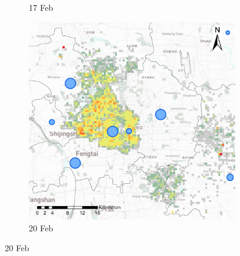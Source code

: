 \documentclass[preprints,article,accept,moreauthors,pdftex]{Definitions/mdpi}
\begin{document}
\begin{figure}[ht]
\begin{subfigure}{.3\textwidth}
        \caption{17 Feb}\label{fig:correlation_02_17}
    \end{subfigure}
    \begin{subfigure}{.3\textwidth}
        \includegraphics[width=\textwidth]{Figures/Relation_with_confrimed_cases/NewDistrictSSBD2020_02_20.eps}
        \caption{20 Feb}\label{fig:correlation_02_20}
    \end{subfigure}
    

\end{figure}
\end{document}
